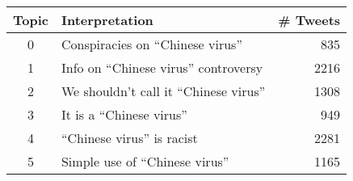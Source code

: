 \begin{tabular}{clr}
\toprule
 Topic &                          Interpretation &  \# Tweets \\
\midrule
     0 &       Conspiracies on ``Chinese virus'' &       835 \\
     1 &   Info on ``Chinese virus'' controversy &      2216 \\
     2 &  We shouldn't call it ``Chinese virus'' &      1308 \\
     3 &               It is a ``Chinese virus'' &       949 \\
     4 &             ``Chinese virus'' is racist &      2281 \\
     5 &         Simple use of ``Chinese virus'' &      1165 \\
\bottomrule
\end{tabular}

